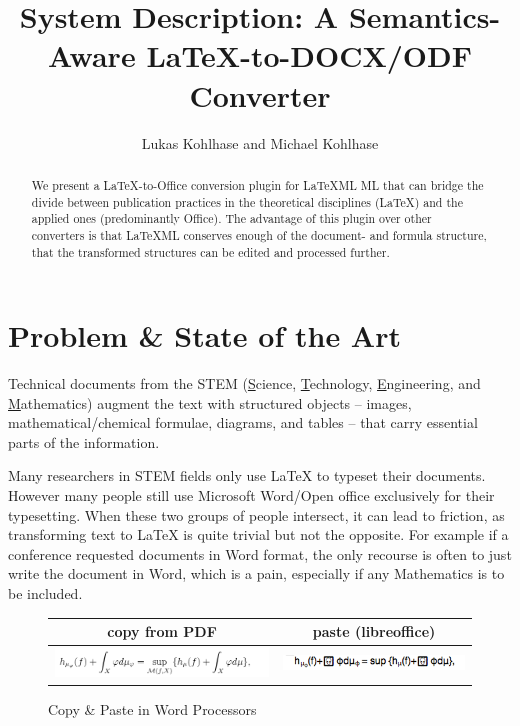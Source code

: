 \documentclass{llncs}
\title{System Description: A Semantics-Aware {\LaTeX}-to-DOCX/ODF Converter}
\author{Lukas Kohlhase and Michael Kohlhase}
\institute{Mathematics/Computer Science\\
  Jacobs University Bremen}
\def\latexml{{\LaTeX}ML\xspace}
\begin{document}
\maketitle
\begin{abstract}
  We present a {\LaTeX}-to-Office conversion plugin for \latexml ML that can bridge the
  divide between publication practices in the theoretical disciplines (\LaTeX) and the
  applied ones (predominantly Office). The advantage of this plugin over other converters
  is that \latexml conserves enough of the document- and formula structure, that the
  transformed structures can be edited and processed further.
\end{abstract}

\section{Problem \& State of the Art}\label{sec:intro}

Technical documents from the STEM (\underline{S}cience, \underline{T}echnology,
\underline{E}ngineering, and \underline{M}athematics) augment the text with structured
objects -- images, mathematical/chemical formulae, diagrams, and tables -- that carry
essential parts of the information. 


Many researchers in STEM fields only use {\LaTeX} to typeset their documents. However many 
people still use Microsoft Word/Open office exclusively for their typesetting. When these
two groups of people intersect, it can lead to friction, as transforming text to {\LaTeX}
is quite trivial but not the opposite. For example if a conference requested documents in
Word format, the only recourse is often to just write the document in Word, which is a
pain, especially if any Mathematics is to be included.

\begin{figure}[ht]
  \begin{tabular}{|c|c|}\hline%
    copy from PDF & paste (libreoffice)\\\hline
    \includegraphics[width=6cm]{mathsnippet} & 
    \includegraphics[width=5cm]{mathsnippet-libreoffice}\\\hline
  \end{tabular}
\caption{Copy \& Paste in Word Processors}\label{fig:cnp}
\end{figure}
\end{document}
